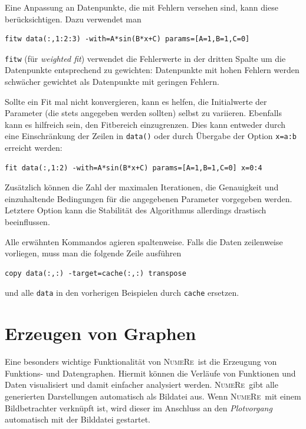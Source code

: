 \documentclass[DIV=14,headsepline,footsepline]{scrbook}
\newcommand{\NR}{\textsc{Nu\-me\-Re}}
\begin{document}
				Eine Anpassung an Datenpunkte, die mit Fehlern versehen sind, kann diese berücksichtigen. Dazu verwendet man
				\begin{lstlisting}
fitw data(:,1:2:3) -with=A*sin(B*x+C) params=[A=1,B=1,C=0]
				\end{lstlisting}
				\verb+fitw+ (für \emph{weighted fit}) verwendet die Fehlerwerte in der dritten Spalte um die Datenpunkte entsprechend zu gewichten: Datenpunkte mit hohen Fehlern werden schwächer gewichtet als Datenpunkte mit geringen Fehlern.
				
				Sollte ein Fit mal nicht konvergieren, kann es helfen, die Initialwerte der Parameter (die stets angegeben werden sollten) selbst zu variieren. Ebenfalls kann es hilfreich sein, den Fitbereich einzugrenzen. Dies kann entweder durch eine Einschränkung der Zeilen in \verb+data()+ oder durch Übergabe der Option \verb+x=a:b+ erreicht werden:
				\begin{lstlisting}
fit data(:,1:2) -with=A*sin(B*x+C) params=[A=1,B=1,C=0] x=0:4
				\end{lstlisting}
				Zusätzlich können die Zahl der maximalen Iterationen, die Genauigkeit und einzuhaltende Bedingungen für die angegebenen Parameter vorgegeben werden. Letztere Option kann die Stabilität des Algorithmus allerdings drastisch beeinflussen.
				
				Alle erwähnten Kommandos agieren spaltenweise. Falls die Daten zeilenweise vorliegen, muss man die folgende Zeile ausführen
				\begin{lstlisting}
copy data(:,:) -target=cache(:,:) transpose
				\end{lstlisting}
				und alle \verb+data+ in den vorherigen Beispielen durch \verb+cache+ ersetzen.
		\chapter{Erzeugen von Graphen}
			Eine besonders wichtige Funktionalität von \NR\ ist die Erzeugung von Funktions- und Datengraphen. Hiermit können die Verläufe von Funktionen und Daten visualisiert und damit einfacher analysiert werden. \NR\ gibt alle generierten Darstellungen automatisch als Bildatei aus. Wenn \NR\ mit einem Bildbetrachter verknüpft ist, wird dieser im Anschluss an den \emph{Plotvorgang} automatisch mit der Bilddatei gestartet.
\end{document}
